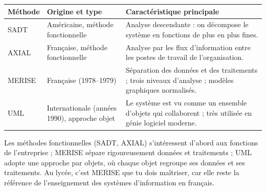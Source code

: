 \documentclass[11pt]{article}
\newcommand{\cle}[1]{{\popxbold\color{popdark}#1}}
\begin{document}
\begin{center}
\begin{tabularx}{\linewidth}{|l|X|X|}
\hline
\rowcolor{popblueL} \textbf{Méthode} & \textbf{Origine et type} & \textbf{Caractéristique principale} \\
\hline
\cle{SADT} & Américaine, méthode fonctionnelle & Analyse descendante : on décompose le système en fonctions de plus en plus fines. \\
\hline
\cle{AXIAL} & Française, méthode fonctionnelle & Analyse par les flux d'information entre les postes de travail de l'organisation. \\
\hline
\cle{MERISE} & Française (1978--1979) & Séparation des données et des traitements ; trois niveaux d'analyse ; modèles graphiques normalisés. \\
\hline
\cle{UML} & Internationale (années 1990), approche objet & Le système est vu comme un ensemble d'objets qui collaborent ; très utilisée en génie logiciel moderne. \\
\hline
\end{tabularx}
\end{center}

Les méthodes \cle{fonctionnelles} (SADT, AXIAL) s'intéressent d'abord aux fonctions de l'entreprise ; MERISE sépare rigoureusement données et traitements ; \cle{UML} adopte une approche par objets, où chaque objet regroupe ses données et ses traitements. Au lycée, c'est MERISE que tu dois maîtriser, car elle reste la référence de l'enseignement des systèmes d'information en français.
\end{document}
